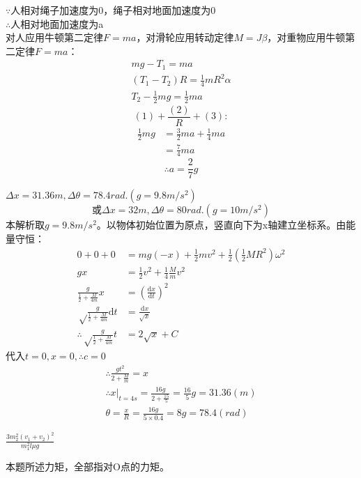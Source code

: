 \documentclass[b5paper,opensource,sourcefont,parskip]{qyxf-book}
\newcommand{\di}[1]{\mathrm{d}#1}
\newcommand{\dy}[2]{\frac{\di{#1}}{\di{#2}}}
\begin{document}
$ \because $人相对绳子加速度为0，绳子相对地面加速度为0\\
$ \therefore $人相对地面加速度为a\\
对人应用牛顿第二定律$F=ma$，对滑轮应用转动定律$M=J\beta$，对重物应用牛顿第二定律$F=ma$：
\begin{gather}
mg-T_1=ma\\
(T_1-T_2)R=\frac{1}{4}mR^2\alpha\\
T_2-\frac{1}{2}mg=\frac{1}{2}ma
\end{gather}
\[(1)+\frac{(2)}{R}+(3):\]
\begin{align*}
\frac{1}{2}mg&=\frac{3}{2}ma+\frac{1}{4}ma\\
&=\frac{7}{4}ma
\end{align*}
\[\therefore a=\frac{2}{7}g\]

$\Delta x=31.36m,\Delta\theta=78.4rad.(g=9.8m/s^2)$
\[\text{或}\Delta x=32m,\Delta\theta=80rad.(g=10m/s^2)\]
本解析取$ g=9.8m/s^2 $。以物体初始位置为原点，竖直向下为x轴建立坐标系。由能量守恒：
\begin{align*}
0+0+0&=mg(-x)+\frac{1}{2}mv^2+\frac{1}{2}\left(\frac{1}{2}MR^2\right)\omega^2\\
gx&=\frac{1}{2}v^2+\frac{1}{4}\frac{M}{m}v^2\\
\frac{g}{\frac{1}{2}+\frac{M}{4m}}x&=\left(\dy{x}{t}\right)^2\\
\sqrt\frac{g}{\frac{1}{2}+\frac{M}{4m}}\di{t}&=\frac{\di{x}}{\sqrt{x}}\\
\therefore \sqrt\frac{g}{\frac{1}{2}+\frac{M}{4m}}t&=2\sqrt{x}+C
\end{align*}
代入$ t=0,x=0,\therefore c=0 $
\begin{gather*}
\therefore \frac{gt^2}{2+\frac{M}{m}}=x\\
\therefore x\left.\right|_{t=4s}=\frac{16g}{2+\frac{15}{5}}=\frac{16}{5}g=31.36(m)\\
\theta=\frac{x}{R}=\frac{16g}{5\times 0.4}=8g=78.4(rad)
\end{gather*}

$\frac{3m_2^2(v_1+v_2)^2}{m_1^2l\mu g}$

本题所述力矩，全部指对O点的力矩。
\end{document}
